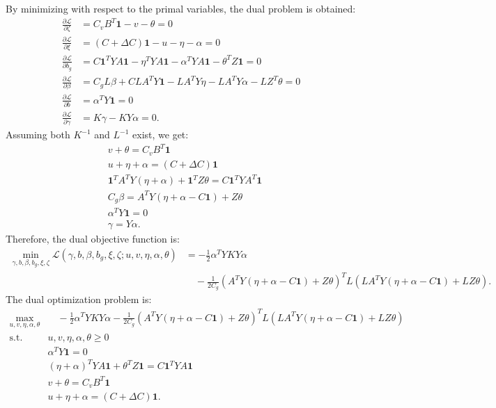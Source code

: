 \documentclass[12pt]{article}
\begin{document}
	By minimizing with respect to the primal variables, the dual problem is obtained:
	\begin{align}
		\frac{\partial \mathcal{L}}{\partial \zeta} &= C_v B^T \mathbf{1} - v - \theta = 0 \\
		\frac{\partial \mathcal{L}}{\partial \xi} &= (C + \Delta C) \mathbf{1} - u - \eta - \alpha = 0 \\
		\frac{\partial \mathcal{L}}{\partial b_g} &= C \mathbf{1}^T Y A \mathbf{1} - \eta^T Y A \mathbf{1} - \alpha^T Y A \mathbf{1} - \theta^T Z \mathbf{1} = 0 \\
		\frac{\partial \mathcal{L}}{\partial \beta} &= C_g L \beta + C L A^T Y \mathbf{1} - L A^T Y \eta - L A^T Y \alpha - L Z^T \theta = 0 \\
		\frac{\partial \mathcal{L}}{\partial b} &= \alpha^T Y \mathbf{1} = 0 \\
		\frac{\partial \mathcal{L}}{\partial \gamma} &= K \gamma - K Y \alpha = 0.
	\end{align}
	Assuming both $K^{-1}$ and $L^{-1}$ exist, we get:
	\begin{align}
		&v + \theta = C_v B^T \mathbf{1} \\
		&u + \eta + \alpha = (C + \Delta C) \mathbf{1} \\
		&\mathbf{1}^T A^T Y (\eta + \alpha) + \mathbf{1}^T Z \theta = C \mathbf{1}^T Y A^T \mathbf{1} \\
		&C_g \beta = A^T Y (\eta + \alpha - C \mathbf{1}) + Z \theta \\
		&\alpha^T Y \mathbf{1} = 0 \\
		&\gamma = Y \alpha.
	\end{align}
	Therefore, the dual objective function is:
	\begin{align}
		\min_{\gamma, b, \beta, b_g, \xi, \zeta} \mathcal{L}(\gamma, b, \beta, b_g, \xi, \zeta; u, v, \eta, \alpha, \theta) &= -\frac{1}{2} \alpha^T Y K Y \alpha \\
		&\quad - \frac{1}{2 C_g} \left( A^T Y (\eta + \alpha - C \mathbf{1}) + Z \theta \right)^T L \left( L A^T Y (\eta + \alpha - C \mathbf{1}) + L Z \theta \right).
	\end{align}
	The dual optimization problem is:
	\begin{subequations}
		\begin{align}
			\max_{u, v, \eta, \alpha, \theta} &\quad -\frac{1}{2} \alpha^T Y K Y \alpha - \frac{1}{2 C_g} \left( A^T Y (\eta + \alpha - C \mathbf{1}) + Z \theta \right)^T L \left( L A^T Y (\eta + \alpha - C \mathbf{1}) + L Z \theta \right) \\
			\text{s.t. } &u, v, \eta, \alpha, \theta \ge 0 \\
			&\alpha^T Y \mathbf{1} = 0 \\
			&(\eta + \alpha)^T Y A \mathbf{1} + \theta^T Z \mathbf{1} = C \mathbf{1}^T Y A \mathbf{1} \\
			&v + \theta = C_v B^T \mathbf{1} \\
			&u + \eta + \alpha = (C + \Delta C) \mathbf{1}.
		\end{align}
	\end{subequations}
\end{document}
